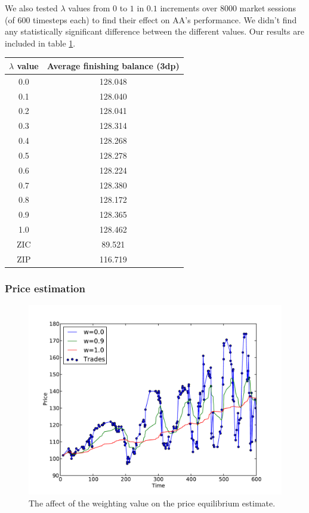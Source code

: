 \documentclass{acm_proc_article-sp}
\begin{document}
We also tested $\lambda$ values from $0$ to $1$ in $0.1$ increments over 8000 
market sessions (of 600 timesteps each) to find their effect on AA's performance. We didn't find any
statistically significant difference between the different values. Our results
are included in table \ref{tbl:lambda_results}.
\begin{table}
  \centering
  \label{tbl:lambda_results}
  \begin{tabular}{ | c | c | }
    \hline
    \textbf{$\lambda$ value} & \textbf{Average finishing balance (3dp)} \\
    \hline
    0.0 & 128.048 \\
    0.1 & 128.040 \\
    0.2 & 128.041 \\
    0.3 & 128.314 \\
    0.4 & 128.268 \\
    0.5 & 128.278 \\
    0.6 & 128.224 \\
    0.7 & 128.380 \\
    0.8 & 128.172 \\
    0.9 & 128.365 \\
    1.0 & 128.462 \\
    \hline \hline
    ZIC & 89.521 \\
    ZIP & 116.719 \\
    \hline
  \end{tabular}
\end{table}

\subsubsection{Price estimation} \label{sec:AA_price_estimation}

\begin{figure}
  \centering
  \includegraphics[width=\columnwidth]{graphs_and_stats/equilibriums.pdf}
  \caption{The affect of the weighting value on the price equilibrium
  estimate.}
\end{figure}
\end{document}
